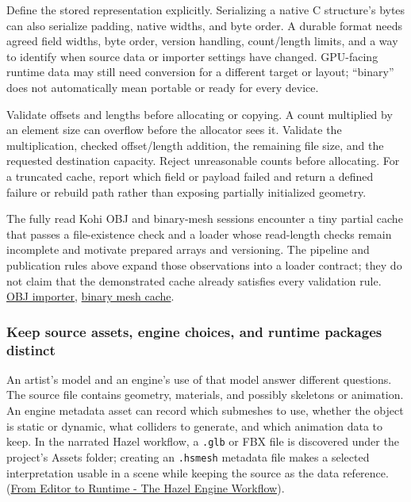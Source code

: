Define the stored representation explicitly. Serializing a native C structure's bytes can also serialize padding, native widths, and byte order. A durable format needs agreed field widths, byte order, version handling, count/length limits, and a way to identify when source data or importer settings have changed. GPU-facing runtime data may still need conversion for a different target or layout; ``binary'' does not automatically mean portable or ready for every device.

Validate offsets and lengths before allocating or copying. A count multiplied by an element size can overflow before the allocator sees it. Validate the multiplication, checked offset/length addition, the remaining file size, and the requested destination capacity. Reject unreasonable counts before allocating. For a truncated cache, report which field or payload failed and return a defined failure or rebuild path rather than exposing partially initialized geometry.

The fully read Kohi OBJ and binary-mesh sessions encounter a tiny partial cache that passes a file-existence check and a loader whose read-length checks remain incomplete and motivate prepared arrays and versioning. The pipeline and publication rules above expand those observations into a loader contract; they do not claim that the demonstrated cache already satisfies every validation rule. \href{https://www.youtube.com/watch?v=kIbW4Kv6p4c}{OBJ importer}, \href{https://www.youtube.com/watch?v=Uk2p3vKBMXE}{binary mesh cache}.

\subsubsection{Keep source assets, engine choices, and runtime packages distinct}\label{06-engine-ii-ch032-keep-source-assets-engine-choices-and-runtime-packages-distinct}

An artist's model and an engine's use of that model answer different questions. The source file contains geometry, materials, and possibly skeletons or animation. An engine metadata asset can record which submeshes to use, whether the object is static or dynamic, what colliders to generate, and which animation data to keep. In the narrated Hazel workflow, a \texttt{.glb} or FBX file is discovered under the project's Assets folder; creating an \texttt{.hsmesh} metadata file makes a selected interpretation usable in a scene while keeping the source as the data reference. (\href{https://www.youtube.com/watch?v=Z2U-S3fxAg8&t=8m48s}{From Editor to Runtime - The Hazel Engine Workflow}).

